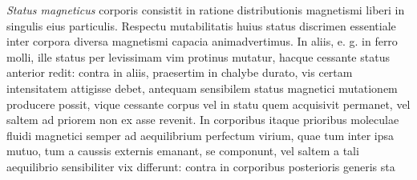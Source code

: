 \textit{Status magneticus} corporis consistit in ratione distributionis magnetismi liberi in singulis eius particulis. Respectu mutabilitatis huius status discrimen essentiale inter corpora diversa magnetismi capacia animadvertimus. In aliis, e. g. in ferro molli, ille status per levissimam vim protinus mutatur, hacque cessante status anterior redit: contra in aliis, praesertim in chalybe durato, vis certam intensitatem attigisse debet, antequam sensibilem status magnetici mutationem producere possit, vique cessante corpus vel in statu quem acquisivit permanet, vel saltem ad priorem non ex asse revenit. In corporibus itaque prioribus moleculae fluidi magnetici semper ad aequilibrium perfectum virium, quae tum inter ipsa mutuo, tum a caussis externis emanant, se componunt, vel saltem a tali aequilibrio sensibiliter vix differunt: contra in corporibus posterioris generis sta%
